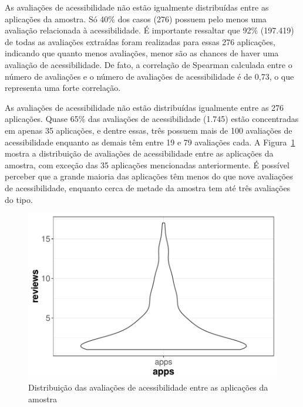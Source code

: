 As avaliações de acessibilidade não estão igualmente distribuídas entre as aplicações da amostra.
Só 40\% dos casos (276) possuem pelo menos uma avaliação relacionada à acessibilidade.
É importante ressaltar que 92\% (197.419) de todas as avaliações extraídas foram realizadas para essas 276 aplicações, indicando que quanto menos avaliações, menor são as chances de haver uma avaliação de acessibilidade. 
De fato, a correlação de Spearman calculada entre o número de avaliações e o número de avaliações de acessibilidade é de 0,73, o que representa uma forte correlação.

As avaliações de acessibilidade não estão distribuídas igualmente entre as 276 aplicações.
Quase 65\% das avaliações de acessibilidade (1.745) estão concentradas em apenas 35 aplicações, e dentre essas, três possuem mais de 100 avaliações de acessibilidade enquanto as demais têm entre 19 e 79 avaliações cada. 
A Figura~\ref{fig:distributionreviewsapp} mostra a distribuição de avaliações de acessibilidade entre as aplicações da amostra, com exceção das 35 aplicações mencionadas anteriormente.
É possível perceber que a grande maioria das aplicações têm menos do que nove avaliações de acessibilidade, enquanto cerca de metade da amostra tem até três avaliações do tipo.


\begin{figure}[!htb]
\centering
\includegraphics[scale=0.80]{imagens/distribution-accreviews-no-outlier-violin.pdf}
\caption{Distribuição das avaliações de acessibilidade entre as aplicações da amostra}
\label{fig:distributionreviewsapp}
\end{figure}


